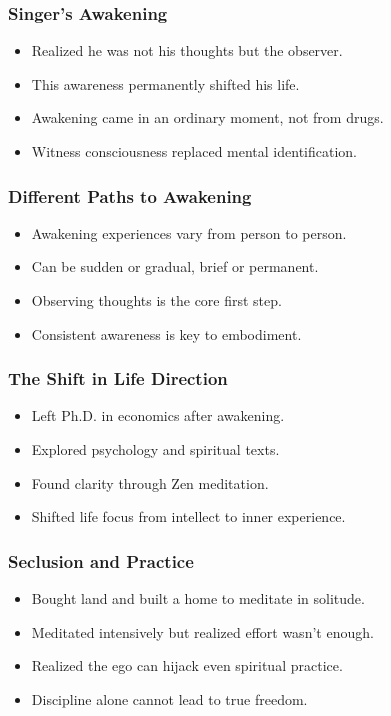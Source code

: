 \begin{frame}[fragile]\frametitle{Singer's Awakening}
    \begin{itemize}
        \item Realized he was not his thoughts but the observer.
        \item This awareness permanently shifted his life.
        \item Awakening came in an ordinary moment, not from drugs.
        \item Witness consciousness replaced mental identification.
    \end{itemize}
\end{frame}

\begin{frame}[fragile]\frametitle{Different Paths to Awakening}
    \begin{itemize}
        \item Awakening experiences vary from person to person.
        \item Can be sudden or gradual, brief or permanent.
        \item Observing thoughts is the core first step.
        \item Consistent awareness is key to embodiment.
    \end{itemize}
\end{frame}

\begin{frame}[fragile]\frametitle{The Shift in Life Direction}
    \begin{itemize}
        \item Left Ph.D. in economics after awakening.
        \item Explored psychology and spiritual texts.
        \item Found clarity through Zen meditation.
        \item Shifted life focus from intellect to inner experience.
    \end{itemize}
\end{frame}

\begin{frame}[fragile]\frametitle{Seclusion and Practice}
    \begin{itemize}
        \item Bought land and built a home to meditate in solitude.
        \item Meditated intensively but realized effort wasn’t enough.
        \item Realized the ego can hijack even spiritual practice.
        \item Discipline alone cannot lead to true freedom.
    \end{itemize}
\end{frame}

